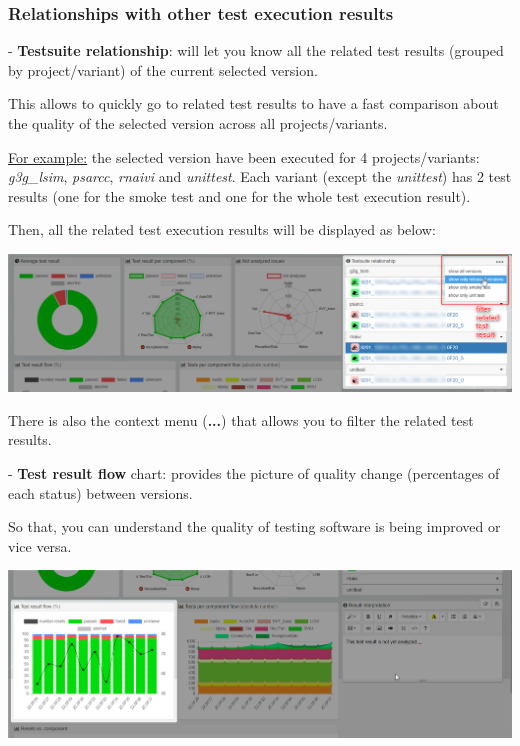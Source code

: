 \subsubsection{Relationships with other test execution results}

- \textbf{Testsuite relationship}: will let you know all the related test 
results (grouped by project/variant) of the current selected version.

This allows to quickly go to related test results to have a fast comparison
about the quality of the selected version across all projects/variants.

\underline{For example:} the selected version have been executed for 4 
projects/variants: \emph{g3g\_lsim}, \emph{psarcc}, \emph{rnaivi} and 
\emph{unittest}. Each variant (except the \emph{unittest}) has 2 test results 
(one for the smoke test and one for the whole test execution result).

Then, all the related test execution results will be displayed as below:

\includegraphics[width=1\linewidth]
{./pictures/dashboard/testsuite_relationship.png}

There is also the context menu (\textbf{...}) that allows you to filter the 
related test results.

- \textbf{Test result flow} chart: provides the picture of quality change 
(percentages of each status) between versions. 

So that, you can understand the quality of testing software is being improved 
or vice versa.

\includegraphics[width=1\linewidth]
{./pictures/dashboard/chart_test_result_flow.png}

